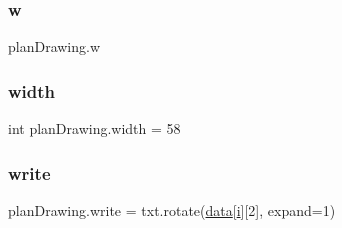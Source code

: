 \mbox{\label{namespaceplan_drawing_ad7a76c8ceac3b7ee1e99ff482407c1af}} 
\subsubsection{\texorpdfstring{w}{w}}
{\footnotesize\ttfamily plan\+Drawing.\+w}

\mbox{\label{namespaceplan_drawing_a514306bc74067f7281091ab310589e78}} 
\subsubsection{\texorpdfstring{width}{width}}
{\footnotesize\ttfamily int plan\+Drawing.\+width = 58}

\mbox{\label{namespaceplan_drawing_adf3ffc21a30cc208673fb4f39fd77c5a}} 
\subsubsection{\texorpdfstring{write}{write}}
{\footnotesize\ttfamily plan\+Drawing.\+write = txt.\+rotate(\mbox{\hyperlink{namespaceplan_drawing_a622e05718ba4ee2b68d34059300226c1}{data}}\mbox{[}\mbox{\hyperlink{namespaceplan_drawing_a9b507814fb99be9c876ea329f40fc0f1}{i}}\mbox{]}\mbox{[}2\mbox{]}, expand=1)}

